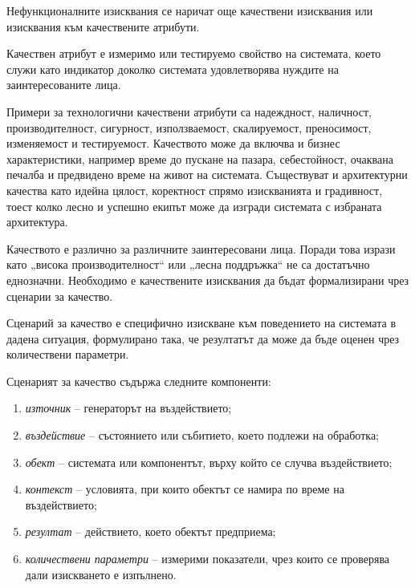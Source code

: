 Нефункционалните изисквания се наричат още качествени изисквания или изисквания към качествените атрибути.

\begin{defn}
Качествен атрибут е измеримо или тестируемо свойство на системата, което служи като индикатор доколко системата удовлетворява нуждите на заинтересованите лица.
\end{defn}

Примери за технологични качествени атрибути са надеждност, наличност, производителност, сигурност, използваемост, скалируемост, преносимост, изменяемост и тестируемост. Качеството може да включва и бизнес характеристики, например време до пускане на пазара, себестойност, очаквана печалба и предвидено време на живот на системата. Съществуват и архитектурни качества като идейна цялост, коректност спрямо изискванията и градивност, тоест колко лесно и успешно екипът може да изгради системата с избраната архитектура.

Качеството е различно за различните заинтересовани лица. Поради това изрази като „висока производителност“ или „лесна поддръжка“ не са достатъчно еднозначни. Необходимо е качествените изисквания да бъдат формализирани чрез сценарии за качество.

\begin{defn}
Сценарий за качество е специфично изискване към поведението на системата в дадена ситуация, формулирано така, че резултатът да може да бъде оценен чрез количествени параметри.
\end{defn}

Сценарият за качество съдържа следните компоненти:

\begin{enumerate}
    \item \emph{източник} -- генераторът на въздействието;
    \item \emph{въздействие} -- състоянието или събитието, което подлежи на обработка;
    \item \emph{обект} -- системата или компонентът, върху който се случва въздействието;
    \item \emph{контекст} -- условията, при които обектът се намира по време на въздействието;
    \item \emph{резултат} -- действието, което обектът предприема;
    \item \emph{количествени параметри} -- измерими показатели, чрез които се проверява дали изискването е изпълнено.
\end{enumerate}

